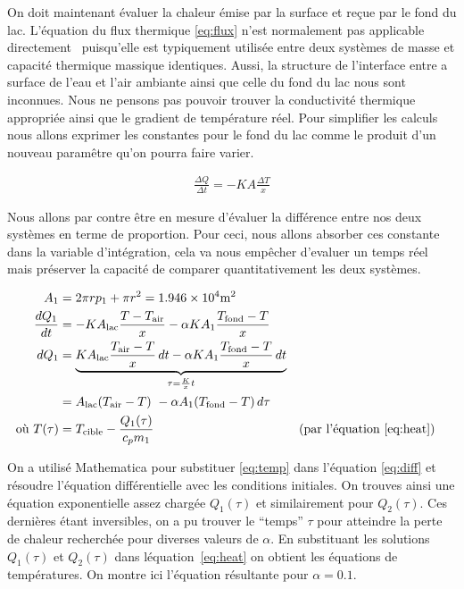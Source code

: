 \documentclass[12pt]{article}
\numberwithin{figure}{section}
\begin{document}
On doit maintenant \'evaluer la chaleur \'emise par la surface et re\c cue par le fond du lac.
L'\'equation du flux thermique \eqref{eq:flux} n'est normalement pas applicable
directement~\cite{HeatFlow} puisqu'elle est typiquement utilis\'ee entre deux syst\`emes de masse et
capacit\'e thermique massique identiques. Aussi, la structure de l'interface entre a surface de
l'eau et l'air ambiante ainsi que celle du fond du lac nous sont inconnues. Nous ne pensons pas
pouvoir trouver la conductivit\'e thermique appropri\'ee ainsi que le gradient de temp\'erature
r\'eel. Pour simplifier les calculs nous allons exprimer les constantes pour le fond du lac comme le
produit d'un nouveau param\^etre qu'on pourra faire varier.

\begin{align}
    \frac{\Delta Q}{\Delta t} = -KA\frac{\Delta T}x \label{eq:flux}
\end{align}

Nous allons par contre \^etre en mesure d'\'evaluer la diff\'erence entre nos deux syst\`emes en
terme de proportion. Pour ceci, nous allons absorber ces constante dans la variable d'int\'egration,
cela va nous emp\^echer d'evaluer un temps r\'eel mais pr\'eserver la capacit\'e de comparer
quantitativement les deux syst\`emes.

\begin{align}
    A_1 &= 2\pi r p_1 + \pi r^2 = \num{1.946e4}\si{\square\meter}\notag\\
    \frac{dQ_1}{dt} &=
        -KA_\text{lac}\frac{T - T_\text{air}}x -\alpha KA_1\frac{T_\text{fond}-T}x\notag\\
    dQ_1 &=
        \underbrace{KA_\text{lac}\frac{T_\text{air}-T}x\,dt
        -\alpha KA_1\frac{T_\text{fond}-T}x\,dt}_{\tau = \frac Kxt}\notag\\
    &= A_\text{lac}(T_\text{air} - T)\ - \alpha A_1(T_\text{fond} - T)\,d\tau\label{eq:diff}\\
    \text{o\`u } T(\tau) &= T_\text{cible} - \frac{Q_1(\tau)}{c_pm_1} \label{eq:temp}&&\text{(par l'\'equation \ref{eq:heat})}
\end{align}

On a utilis\'e Mathematica pour substituer \eqref{eq:temp} dans l'\'equation \eqref{eq:diff} et
r\'esoudre l'\'equation diff\'erentielle avec les conditions initiales. On trouves ainsi une
\'equation exponentielle assez charg\'ee $Q_1(\tau)$ et similairement pour $Q_2(\tau)$. Ces
derni\`eres \'etant inversibles, on a pu trouver le ``temps'' $\tau$ pour atteindre la perte de
chaleur recherch\'ee pour diverses valeurs de $\alpha$. En substituant les solutions $Q_1(\tau)$ et
$Q_2(\tau)$ dans l\'equation~\ref{eq:heat} on obtient les \'equations de temp\'eratures. On montre
ici l'\'equation r\'esultante pour $\alpha = 0.1$.
\end{document}
